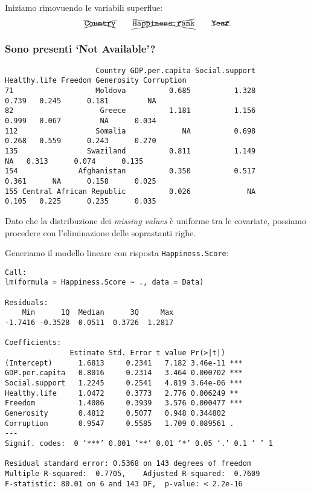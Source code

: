 \documentclass{beamer}
\newcommand{\fg}[2]{%
  \begin{center}
      \texttt{[image: \#2]}%
  \end{center}
}
\begin{document}
\begin{frame}
    Iniziamo rimovuendo le variabili superflue:
    \begin{equation*}
    \xcancel{\texttt{Country}} \qquad \xcancel{\texttt{Happiness.rank}}\qquad\xcancel{\texttt{Year}}
    \end{equation*}
\end{frame}

\begin{frame}[fragile]
    \frametitle{Sono presenti `Not Available'?}
    \tiny
    \begin{verbatim}
                     Country GDP.per.capita Social.support Healthy.life Freedom Generosity Corruption
71                   Moldova          0.685          1.328        0.739   0.245      0.181         NA
82                    Greece          1.181          1.156        0.999   0.067         NA      0.034
112                  Somalia             NA          0.698        0.268   0.559      0.243      0.270
135                Swaziland          0.811          1.149           NA   0.313      0.074      0.135
154              Afghanistan          0.350          0.517        0.361      NA      0.158      0.025
155 Central African Republic          0.026             NA        0.105   0.225      0.235      0.035
    \end{verbatim}

    \normalsize Dato che la distribuzione dei \textit{missing values} è uniforme tra le covariate, possiamo procedere con l'eliminazione delle soprastanti righe.
\end{frame}

\begin{frame}
\end{frame}


\begin{frame}[fragile]
	Generiamo il modello lineare con risposta \texttt{Happiness.Score}:

	\tiny
	\begin{verbatim}
Call:
lm(formula = Happiness.Score ~ ., data = Data)

Residuals:
    Min      1Q  Median      3Q     Max 
-1.7416 -0.3528  0.0511  0.3726  1.2817 

Coefficients:
               Estimate Std. Error t value Pr(>|t|)    
(Intercept)      1.6813     0.2341   7.182 3.46e-11 ***
GDP.per.capita   0.8016     0.2314   3.464 0.000702 ***
Social.support   1.2245     0.2541   4.819 3.64e-06 ***
Healthy.life     1.0472     0.3773   2.776 0.006249 ** 
Freedom          1.4086     0.3939   3.576 0.000477 ***
Generosity       0.4812     0.5077   0.948 0.344802    
Corruption       0.9547     0.5585   1.709 0.089561 .  
---
Signif. codes:  0 ‘***’ 0.001 ‘**’ 0.01 ‘*’ 0.05 ‘.’ 0.1 ‘ ’ 1

Residual standard error: 0.5368 on 143 degrees of freedom
Multiple R-squared:  0.7705,    Adjusted R-squared:  0.7609 
F-statistic: 80.01 on 6 and 143 DF,  p-value: < 2.2e-16
	\end{verbatim}
\end{frame}
\end{document}

